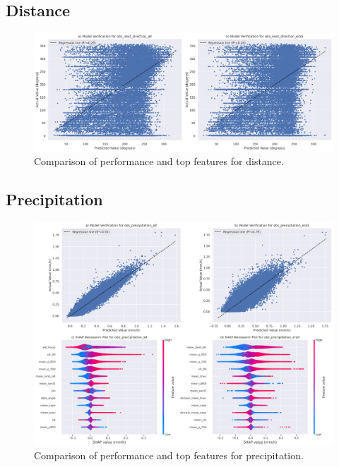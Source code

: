 \subsection{Distance}

\begin{figure}[h]
    \centering
    \includegraphics[width=\textwidth]{../figures/generated/experiments/obs_next_direction/obs_next_direction_summary.png}
    \caption{Comparison of performance and top features for distance.}
    \label{fig:obs_distance_summary}
\end{figure}

\subsection{Precipitation}

\begin{figure}[h]
    \centering
    \includegraphics[width=\textwidth]{../figures/generated/experiments/obs_precipitation/obs_precipitation_summary.png}
    \caption{Comparison of performance and top features for precipitation.}
    \label{fig:obs_precipitation_summary}
\end{figure}